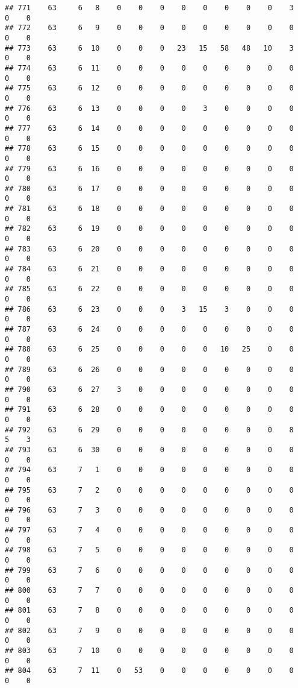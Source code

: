 \documentclass[]{article}
\begin{document}
\begin{verbatim}
## 771    63     6   8    0    0    0    0    0    0    0    0    3    0    0
## 772    63     6   9    0    0    0    0    0    0    0    0    0    0    0
## 773    63     6  10    0    0    0   23   15   58   48   10    3    0    0
## 774    63     6  11    0    0    0    0    0    0    0    0    0    0    0
## 775    63     6  12    0    0    0    0    0    0    0    0    0    0    0
## 776    63     6  13    0    0    0    0    3    0    0    0    0    0    0
## 777    63     6  14    0    0    0    0    0    0    0    0    0    0    0
## 778    63     6  15    0    0    0    0    0    0    0    0    0    0    0
## 779    63     6  16    0    0    0    0    0    0    0    0    0    0    0
## 780    63     6  17    0    0    0    0    0    0    0    0    0    0    0
## 781    63     6  18    0    0    0    0    0    0    0    0    0    0    0
## 782    63     6  19    0    0    0    0    0    0    0    0    0    0    0
## 783    63     6  20    0    0    0    0    0    0    0    0    0    0    0
## 784    63     6  21    0    0    0    0    0    0    0    0    0    0    0
## 785    63     6  22    0    0    0    0    0    0    0    0    0    0    0
## 786    63     6  23    0    0    0    3   15    3    0    0    0    0    0
## 787    63     6  24    0    0    0    0    0    0    0    0    0    0    0
## 788    63     6  25    0    0    0    0    0   10   25    0    0    0    0
## 789    63     6  26    0    0    0    0    0    0    0    0    0    0    0
## 790    63     6  27    3    0    0    0    0    0    0    0    0    0    0
## 791    63     6  28    0    0    0    0    0    0    0    0    0    0    0
## 792    63     6  29    0    0    0    0    0    0    0    0    8    5    3
## 793    63     6  30    0    0    0    0    0    0    0    0    0    0    0
## 794    63     7   1    0    0    0    0    0    0    0    0    0    0    0
## 795    63     7   2    0    0    0    0    0    0    0    0    0    0    0
## 796    63     7   3    0    0    0    0    0    0    0    0    0    0    0
## 797    63     7   4    0    0    0    0    0    0    0    0    0    0    0
## 798    63     7   5    0    0    0    0    0    0    0    0    0    0    0
## 799    63     7   6    0    0    0    0    0    0    0    0    0    0    0
## 800    63     7   7    0    0    0    0    0    0    0    0    0    0    0
## 801    63     7   8    0    0    0    0    0    0    0    0    0    0    0
## 802    63     7   9    0    0    0    0    0    0    0    0    0    0    0
## 803    63     7  10    0    0    0    0    0    0    0    0    0    0    0
## 804    63     7  11    0   53    0    0    0    0    0    0    0    0    0

\end{verbatim}
\end{document}
